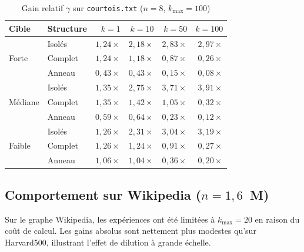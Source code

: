\documentclass[12pt,a4paper]{article}
\theoremstyle{definition}
\begin{document}
\begin{table}[H]
\centering
\caption{Gain relatif $\gamma$ sur \texttt{courtois.txt} ($n=8$, $k_\text{max}=100$)}
\label{tab:courtois}
\small
\begin{tabular}{llrrrr}
\toprule
\textbf{Cible} & \textbf{Structure} & $k=1$ & $k=10$ & $k=50$ & $k=100$ \\
\midrule
\multirow{3}{*}{Forte}
 & Isol\'{e}s  & $1{,}24\times$ & $2{,}18\times$ & $2{,}83\times$ & $2{,}97\times$ \\
 & Complet & $1{,}24\times$ & $1{,}18\times$ & $0{,}87\times$ & $0{,}26\times$ \\
 & Anneau  & $0{,}43\times$ & $0{,}43\times$ & $0{,}15\times$ & $0{,}08\times$ \\
\midrule
\multirow{3}{*}{M\'{e}diane}
 & Isol\'{e}s  & $1{,}35\times$ & $2{,}75\times$ & $3{,}71\times$ & $3{,}91\times$ \\
 & Complet & $1{,}35\times$ & $1{,}42\times$ & $1{,}05\times$ & $0{,}32\times$ \\
 & Anneau  & $0{,}59\times$ & $0{,}64\times$ & $0{,}23\times$ & $0{,}12\times$ \\
\midrule
\multirow{3}{*}{Faible}
 & Isol\'{e}s  & $1{,}26\times$ & $2{,}31\times$ & $3{,}04\times$ & $3{,}19\times$ \\
 & Complet & $1{,}26\times$ & $1{,}24\times$ & $0{,}91\times$ & $0{,}27\times$ \\
 & Anneau  & $1{,}06\times$ & $1{,}04\times$ & $0{,}36\times$ & $0{,}20\times$ \\
\bottomrule
\end{tabular}
\end{table}

\subsection{Comportement sur Wikipedia ($n = 1{,}6$~M)}

Sur le graphe Wikipedia, les exp\'{e}riences ont \'{e}t\'{e} limit\'{e}es \`{a} $k_\text{max}=20$
en raison du co\^{u}t de calcul. Les gains absolus sont nettement plus modestes
qu'sur Harvard500, illustrant l'effet de dilution \`{a} grande \'{e}chelle.
\end{document}
